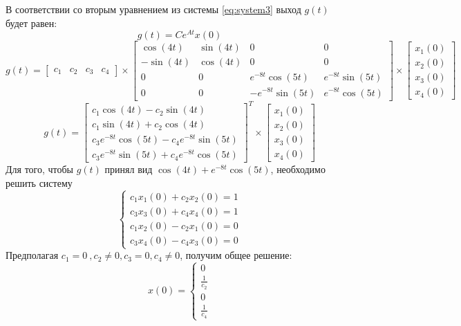 В соответствии со вторым уравнением из системы \ref{eq:system3} выход $g(t)$ будет равен:
\begin{equation}
    g(t) = C e^{At} x(0)
\end{equation}
\begin{equation}
    g(t) = \begin{bmatrix}
        c_1 & c_2 & c_3 & c_4
    \end{bmatrix} \times
    \begin{bmatrix}
        \cos\left(4t\right) & \sin\left(4t\right) & 0 & 0 \\
        -\sin\left(4t\right) & \cos\left(4t\right) & 0 & 0 \\
        0 & 0 & e^{-8t}\cos\left(5t\right) & e^{-8t}\sin\left(5t\right) \\
        0 & 0 & -e^{-8t}\sin\left(5t\right) & e^{-8t}\cos\left(5t\right)
    \end{bmatrix} \times
    \begin{bmatrix}
        x_1(0) \\
        x_2(0) \\
        x_3(0) \\
        x_4(0)
    \end{bmatrix}
\end{equation}
\begin{equation}
    g(t) = \begin{bmatrix}
        c_1 \cos\left(4t\right) - c_2 \sin\left(4t\right) \\
        c_1 \sin\left(4t\right) + c_2 \cos\left(4t\right) \\
        c_3 e^{-8t}\cos\left(5t\right) - c_4 e^{-8t}\sin\left(5t\right) \\
        c_3 e^{-8t}\sin\left(5t\right) + c_4 e^{-8t}\cos\left(5t\right)
    \end{bmatrix}^{T} \times
    \begin{bmatrix}
        x_1(0) \\
        x_2(0) \\
        x_3(0) \\
        x_4(0)
    \end{bmatrix}
\end{equation}
Для того, чтобы $g(t)$ принял вид $\cos(4t) + e^{-8t}\cos(5t)$, необходимо решить систему 
\begin{equation}
    \begin{cases}
        c_1 x_1(0) + c_2 x_2(0) = 1 \\
        c_3 x_3(0) + c_4 x_4(0) = 1 \\
        c_1 x_2(0) - c_2 x_1(0) = 0 \\
        c_3 x_4(0) - c_4 x_3(0) = 0
    \end{cases}
\end{equation}
Предполагая $c_1=0~,c_2\ne0,c_3=0,c_4\ne0$, получим общее решение: 
\begin{equation}
    x(0) = \begin{cases}
        0 \\
        \frac{1}{c_2} \\
        0 \\
        \frac{1}{c_4}
    \end{cases}
\end{equation}

